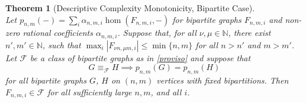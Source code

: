 \documentclass[11pt, DIV=15]{scrarticle}
\theoremstyle{definition}
\theoremstyle{plain}
\newtheorem{theorem}[definition]{Theorem}
\theoremstyle{remark}
\begin{document}
	\begin{theorem}[Descriptive Complexity Monotonicity, Bipartite Case] \label{thm:complexity-monotonicty-bipartite}
		~\\
		Let $p_{n,m}(-) = \sum_i \alpha_{n,m,i} \hom(F_{n,m,i}, -)$ for bipartite graphs $F_{n,m,i}$ and non-zero rational coefficients $\alpha_{n,m,i}$.
		Suppose that, for all $\nu, \mu \in \mathbb{N}$, there exist $n', m' \in \mathbb{N}$,
		such that $\max_i |F_{\nu n, \mu  m,i }| \leq \min\{n,m\}$ for all $n > n'$ and $m > m'$.
		Let $\mathcal{F}$ be a class of bipartite graphs as in \cref{proviso} and suppose that
		\[
		G \equiv_{\mathcal{F}} H \implies
		p_{n,m}(G) = p_{n,m}(H)
		\]
		for all bipartite graphs $G$, $H$ on $(n,m)$ vertices with fixed bipartitions.
		Then $F_{n,m,i} \in \mathcal{F}$ for all sufficiently large $n,m$, and all $i$.
	\end{theorem}
\end{document}
